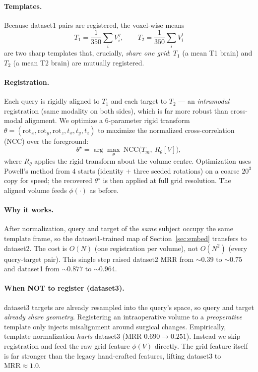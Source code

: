 \documentclass[11pt]{article}
\begin{document}
\paragraph{Templates.} Because dataset1 pairs are registered, the voxel-wise means
\begin{equation}
T_1=\frac{1}{350}\sum_i V^q_i,\qquad
T_2=\frac{1}{350}\sum_i V^t_i
\end{equation}
are two sharp templates that, crucially, \emph{share one grid}: $T_1$ (a mean T1
brain) and $T_2$ (a mean T2 brain) are mutually registered.

\paragraph{Registration.} Each query is rigidly aligned to $T_1$ and each target to
$T_2$ --- an \emph{intramodal} registration (same modality on both sides), which is
far more robust than cross-modal alignment. We optimize a 6-parameter rigid
transform $\theta=(\text{rot}_x,\text{rot}_y,\text{rot}_z,t_x,t_y,t_z)$ to maximize
the normalized cross-correlation (NCC) over the foreground:
\begin{equation}
\theta^\star=\arg\max_{\theta}\ \mathrm{NCC}\big(T_m,\ R_\theta[V]\big),
\end{equation}
where $R_\theta$ applies the rigid transform about the volume centre. Optimization
uses Powell's method from $4$ starts (identity $+$ three seeded rotations) on a
coarse $20^3$ copy for speed; the recovered $\theta^\star$ is then applied at full
grid resolution. The aligned volume feeds $\phi(\cdot)$ as before.

\paragraph{Why it works.} After normalization, query and target of the \emph{same}
subject occupy the same template frame, so the dataset1-trained map of
Section~\ref{sec:embed} transfers to dataset2. The cost is $O(N)$ (one registration
per volume), not $O(N^2)$ (every query-target pair). This single step raised
dataset2 MRR from $\sim0.39$ to $\sim0.75$ and dataset1 from $\sim0.877$ to
$\sim0.964$.

\paragraph{When NOT to register (dataset3).} dataset3 targets are already resampled
into the query's space, so query and target \emph{already share geometry}.
Registering an intraoperative volume to a \emph{preoperative} template only injects
misalignment around surgical changes. Empirically, template normalization
\emph{hurts} dataset3 (MRR $0.690\to0.251$). Instead we skip registration and feed
the raw grid feature $\phi(V)$ directly. The grid feature itself is far stronger
than the legacy hand-crafted features, lifting dataset3 to $\text{MRR}\approx1.0$.
\end{document}
